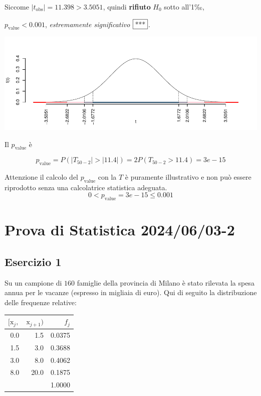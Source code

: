 \documentclass[
  11pt,
]{book}
\theoremstyle{mytheoremstyle}
\theoremstyle{mydefstyle}
\newenvironment{sol}
  {
  \begin{tcolorbox}[enhanced,breakable,arc=0.1mm,boxrule=1pt,colback=white,colframe=iblue,
  title=\bf \fontfamily{lmss}\selectfont \hspace{.5 cm} Soluzione,drop fuzzy shadow]

}{
\end{tcolorbox}
  }
\begin{document}
\begin{sol}
Siccome \(|t_\text{obs}|=11.398>3.5051\), quindi \textbf{rifiuto} \(H_0\) sotto all'1‰,

\(p_\text{value}<0.001\), \emph{estremamente significativo} \(\fbox{***}\).

\begin{center}\includegraphics{Esami_passati_con_soluzioni_files/figure-latex/2024-49-1} \end{center}

Il \(p_{\text{value}}\) è

\[ p_{\text{value}} = P(|T_{50-2}|>|11.4|)=2P(T_{50-2}>11.4)=3e-15 \]

Attenzione il calcolo del \(p_\text{value}\) con la \(T\) è puramente illustrativo e non può essere riprodotto senza una calcolatrice statistica adeguata.\[
 0 < p_\text{value}= 3e-15 \leq 0.001 
\]

\end{sol}

\section{Prova di Statistica 2024/06/03-2}\label{prova-di-statistica-20240603-2}

\subsection{Esercizio 1}\label{esercizio-1-35}

Su un campione di \(160\) famiglie della provincia di Milano è stato rilevata la spesa annua per le vacanze (espresso in migliaia di euro). Qui di seguito la distribuzione delle frequenze relative:

\begin{table}[H]
\centering
\begin{tabular}{rrr}
\toprule
$[\text{x}_j,$ & $\text{x}_{j+1})$ & $f_j$\\
\midrule
0.0 & 1.5 & 0.0375\\
1.5 & 3.0 & 0.3688\\
3.0 & 8.0 & 0.4062\\
8.0 & 20.0 & 0.1875\\
 &  & 1.0000\\
\bottomrule
\end{tabular}
\end{table}
\end{document}
